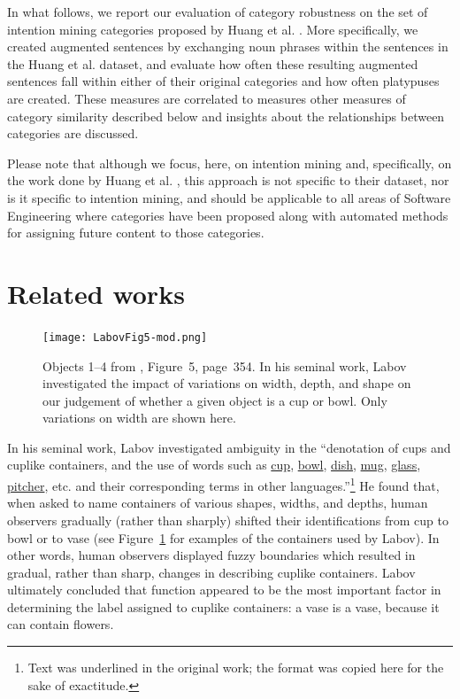 \documentclass[letterpaper, 12 pt, conference]{ieeeconf}
\begin{document}
In what follows, we report our evaluation of category robustness on the set of intention mining categories proposed by Huang et al. \cite{huang:aim:2018}. More specifically, we created augmented sentences by exchanging noun phrases within the sentences in the Huang et al. dataset, and evaluate how often these resulting augmented sentences fall within either of their original categories and how often platypuses are created. These measures are correlated to measures other measures of category similarity described below and insights about the relationships between categories are discussed.

Please note that although we focus, here, on intention mining and, specifically, on the work done by Huang et al. \cite{huang:aim:2018}, this approach is not specific to their dataset, nor is it specific to intention mining, and should be applicable to all areas of Software Engineering where categories have been proposed along with automated methods for assigning future content to those categories. 

\section{Related works}
\begin{figure}
    \centering
    \texttt{[image: LabovFig5-mod.png]}
    \caption{Objects 1--4 from \cite{labov:boundares:1973}, Figure~5, page~354. In his seminal work, Labov investigated the impact of variations on width, depth, and shape on our judgement of whether a given object is a cup or bowl. Only variations on width are shown here.}
    \label{fig:labov}
\end{figure}
In his seminal work, Labov \cite{labov:boundares:1973} investigated ambiguity in the ``denotation of cups and cuplike containers, and the use of words such as \ul{cup}, \ul{bowl}, \ul{dish}, \ul{mug}, \ul{glass}, \ul{pitcher}, etc. and their corresponding terms in other languages.''\footnote{Text was underlined in the original work; the format was copied here for the sake of exactitude.} He found that, when asked to name containers of various shapes, widths, and depths, human observers gradually (rather than sharply) shifted their identifications from cup to bowl or to vase (see Figure~\ref{fig:labov} for examples of the containers used by Labov). In other words, human observers displayed fuzzy boundaries which resulted in gradual, rather than sharp, changes in describing cuplike containers. Labov ultimately concluded that function appeared to be the most important factor in determining the label assigned to cuplike containers: a vase is a vase, because it can contain flowers.
\end{document}
